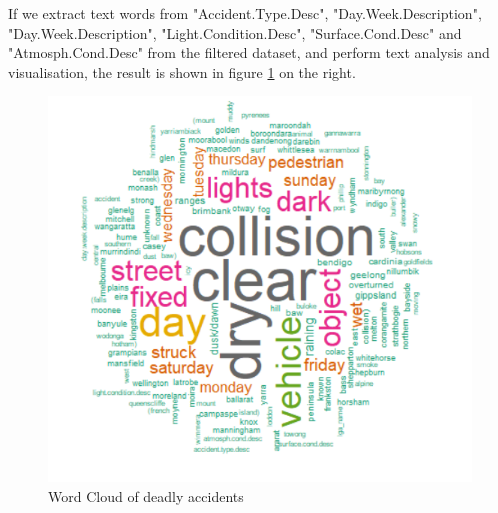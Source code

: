 \documentclass[10pt]{article}
\theoremstyle{definition}
\begin{document}
\begin{minipage}{\linewidth}
  	\centering
  \begin{minipage}{0.49\linewidth}
     If we extract text words from "Accident.Type.Desc", "Day.Week.Description", "Day.Week.Description", "Light.Condition.Desc", "Surface.Cond.Desc" and "Atmosph.Cond.Desc" from the filtered dataset, and perform text analysis and visualisation, the result is shown in figure \ref{fig:wordcloud} on the right.
  \end{minipage}
  \hspace{0.0\linewidth}
  \begin{minipage}{0.49\linewidth}
     \begin{figure}[H]
            \includegraphics[width=\linewidth]{images/wordCloud.png}
				{\caption{Word Cloud of deadly accidents}}
			\label{fig:wordcloud}
    \end{figure}
    \end{minipage}
\end{minipage}\\
\end{document}
